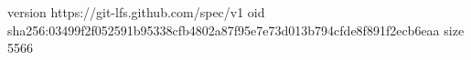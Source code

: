version https://git-lfs.github.com/spec/v1
oid sha256:03499f2f052591b95338cfb4802a87f95e7e73d013b794cfde8f891f2ecb6eaa
size 5566

